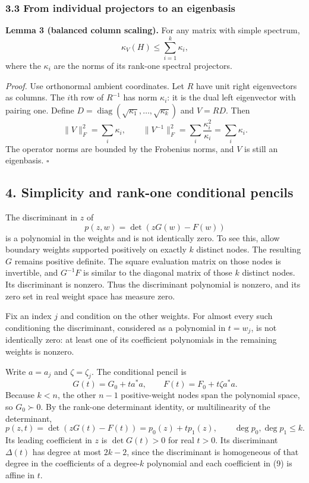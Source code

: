 \documentclass[
  11pt,
]{article}
\begin{document}
\subsubsection{3.3 From individual projectors to an
eigenbasis}\label{from-individual-projectors-to-an-eigenbasis}

\textbf{Lemma 3 (balanced column scaling).} For any matrix with simple
spectrum, \[
\kappa_V(H)\leq\sum_{i=1}^k\kappa_i, \tag{8}
\] where the \(\kappa_i\) are the norms of its rank-one spectral
projectors.

\emph{Proof.} Use orthonormal ambient coordinates. Let \(R\) have unit
right eigenvectors as columns. The \(i\)th row of \(R^{-1}\) has norm
\(\kappa_i\): it is the dual left eigenvector with pairing one. Define
\(D=\operatorname{diag}(\sqrt{\kappa_1},\ldots,\sqrt{\kappa_k})\) and
\(V=RD\). Then \[
\|V\|_F^2=\sum_i\kappa_i,
\qquad
\|V^{-1}\|_F^2=\sum_i\frac{\kappa_i^2}{\kappa_i}=\sum_i\kappa_i.
\] The operator norms are bounded by the Frobenius norms, and \(V\) is
still an eigenbasis. \(\square\)

\subsection{4. Simplicity and rank-one conditional
pencils}\label{simplicity-and-rank-one-conditional-pencils}

The discriminant in \(z\) of \[
p(z,w)=\det(zG(w)-F(w))
\] is a polynomial in the weights and is not identically zero. To see
this, allow boundary weights supported positively on exactly \(k\)
distinct nodes. The resulting \(G\) remains positive definite. The
square evaluation matrix on those nodes is invertible, and \(G^{-1}F\)
is similar to the diagonal matrix of those \(k\) distinct nodes. Its
discriminant is nonzero. Thus the discriminant polynomial is nonzero,
and its zero set in real weight space has measure zero.

Fix an index \(j\) and condition on the other weights. For almost every
such conditioning the discriminant, considered as a polynomial in
\(t=w_j\), is not identically zero: at least one of its coefficient
polynomials in the remaining weights is nonzero.

Write \(a=a_j\) and \(\zeta=\zeta_j\). The conditional pencil is \[
G(t)=G_0+ta^*a,\qquad F(t)=F_0+t\zeta a^*a.
\] Because \(k<n\), the other \(n-1\) positive-weight nodes span the
polynomial space, so \(G_0\succ0\). By the rank-one determinant
identity, or multilinearity of the determinant, \[
p(z,t)=\det(zG(t)-F(t))=p_0(z)+tp_1(z),\qquad
\deg p_0,\deg p_1\leq k. \tag{9}
\] Its leading coefficient in \(z\) is \(\det G(t)>0\) for real \(t>0\).
Its discriminant \(\Delta(t)\) has degree at most \(2k-2\), since the
discriminant is homogeneous of that degree in the coefficients of a
degree-\(k\) polynomial and each coefficient in (9) is affine in \(t\).
\end{document}
